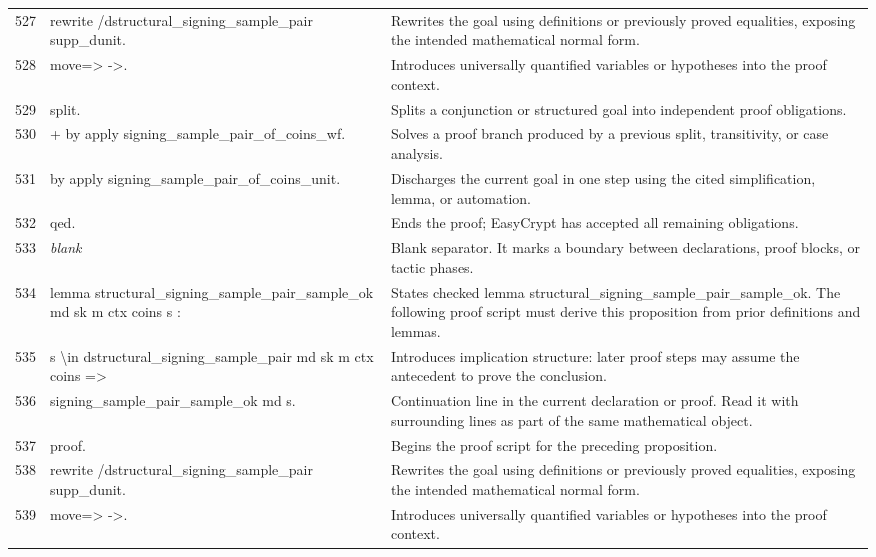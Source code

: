 \documentclass[10pt]{article}
\begin{document}
\begin{longtable}{r L{0.53\textwidth} L{0.37\textwidth}}
527 & {\ttfamily\scriptsize rewrite /dstructural\_signing\_sample\_pair supp\_dunit.} & Rewrites the goal using definitions or previously proved equalities, exposing the intended mathematical normal form. \\
528 & {\ttfamily\scriptsize move=> ->.} & Introduces universally quantified variables or hypotheses into the proof context. \\
529 & {\ttfamily\scriptsize split.} & Splits a conjunction or structured goal into independent proof obligations. \\
530 & {\ttfamily\scriptsize + by apply signing\_sample\_pair\_of\_coins\_wf.} & Solves a proof branch produced by a previous split, transitivity, or case analysis. \\
531 & {\ttfamily\scriptsize by apply signing\_sample\_pair\_of\_coins\_unit.} & Discharges the current goal in one step using the cited simplification, lemma, or automation. \\
532 & {\ttfamily\scriptsize qed.} & Ends the proof; EasyCrypt has accepted all remaining obligations. \\
533 & {\ttfamily\scriptsize \emph{blank}} & Blank separator.  It marks a boundary between declarations, proof blocks, or tactic phases. \\
534 & {\ttfamily\scriptsize lemma structural\_signing\_sample\_pair\_sample\_ok md sk m ctx coins s :} & States checked lemma structural\_signing\_sample\_pair\_sample\_ok.  The following proof script must derive this proposition from prior definitions and lemmas. \\
535 & {\ttfamily\scriptsize   s \textbackslash{}in dstructural\_signing\_sample\_pair md sk m ctx coins =>} & Introduces implication structure: later proof steps may assume the antecedent to prove the conclusion. \\
536 & {\ttfamily\scriptsize   signing\_sample\_pair\_sample\_ok md s.} & Continuation line in the current declaration or proof.  Read it with surrounding lines as part of the same mathematical object. \\
537 & {\ttfamily\scriptsize proof.} & Begins the proof script for the preceding proposition. \\
538 & {\ttfamily\scriptsize rewrite /dstructural\_signing\_sample\_pair supp\_dunit.} & Rewrites the goal using definitions or previously proved equalities, exposing the intended mathematical normal form. \\
539 & {\ttfamily\scriptsize move=> ->.} & Introduces universally quantified variables or hypotheses into the proof context. \\

\end{longtable}
\end{document}
